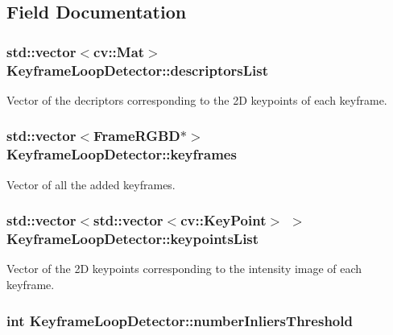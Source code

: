 \subsection{Field Documentation}
\hypertarget{class_keyframe_loop_detector_a523e7cacd0a93ce8bc5a55100c571bed}{
\subsubsection[{descriptorsList}]{\setlength{\rightskip}{0pt plus 5cm}std::vector$<$cv::Mat$>$ {\bf KeyframeLoopDetector::descriptorsList}}}
\label{class_keyframe_loop_detector_a523e7cacd0a93ce8bc5a55100c571bed}
Vector of the decriptors corresponding to the 2D keypoints of each keyframe. \hypertarget{class_keyframe_loop_detector_a9fc839f91a21d9666dbf40610d2be7df}{
\subsubsection[{keyframes}]{\setlength{\rightskip}{0pt plus 5cm}std::vector$<${\bf FrameRGBD}$\ast$$>$ {\bf KeyframeLoopDetector::keyframes}}}
\label{class_keyframe_loop_detector_a9fc839f91a21d9666dbf40610d2be7df}
Vector of all the added keyframes. \hypertarget{class_keyframe_loop_detector_aed3185bed2b9c9c1e342d155f370bc60}{
\subsubsection[{keypointsList}]{\setlength{\rightskip}{0pt plus 5cm}std::vector$<$std::vector$<$cv::KeyPoint$>$ $>$ {\bf KeyframeLoopDetector::keypointsList}}}
\label{class_keyframe_loop_detector_aed3185bed2b9c9c1e342d155f370bc60}
Vector of the 2D keypoints corresponding to the intensity image of each keyframe. \hypertarget{class_keyframe_loop_detector_a88bfa794730e06898b2f9aede72f22ca}{
\subsubsection[{numberInliersThreshold}]{\setlength{\rightskip}{0pt plus 5cm}int {\bf KeyframeLoopDetector::numberInliersThreshold}}}
